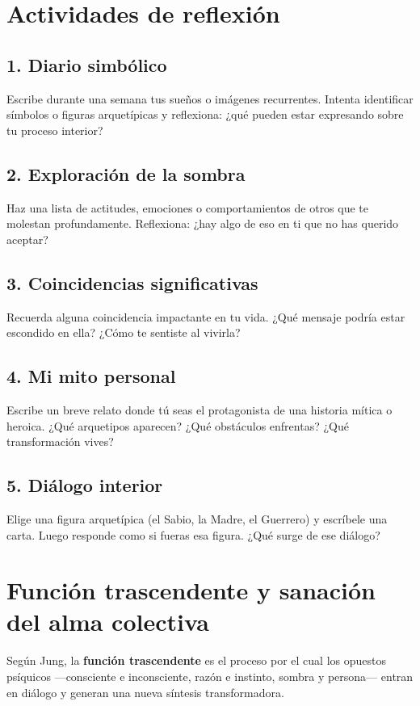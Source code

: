 \section*{Actividades de reflexión}

\subsection*{1. Diario simbólico}
Escribe durante una semana tus sueños o imágenes recurrentes. Intenta identificar símbolos o figuras arquetípicas y reflexiona: ¿qué pueden estar expresando sobre tu proceso interior?

\subsection*{2. Exploración de la sombra}
Haz una lista de actitudes, emociones o comportamientos de otros que te molestan profundamente. Reflexiona: ¿hay algo de eso en ti que no has querido aceptar?

\subsection*{3. Coincidencias significativas}
Recuerda alguna coincidencia impactante en tu vida. ¿Qué mensaje podría estar escondido en ella? ¿Cómo te sentiste al vivirla?

\subsection*{4. Mi mito personal}
Escribe un breve relato donde tú seas el protagonista de una historia mítica o heroica. ¿Qué arquetipos aparecen? ¿Qué obstáculos enfrentas? ¿Qué transformación vives?

\subsection*{5. Diálogo interior}
Elige una figura arquetípica (el Sabio, la Madre, el Guerrero) y escríbele una carta. Luego responde como si fueras esa figura. ¿Qué surge de ese diálogo?

\section*{Función trascendente y sanación del alma colectiva}

Según Jung, la \textbf{función trascendente} es el proceso por el cual los opuestos psíquicos —consciente e inconsciente, razón e instinto, sombra y persona— entran en diálogo y generan una nueva síntesis transformadora.


